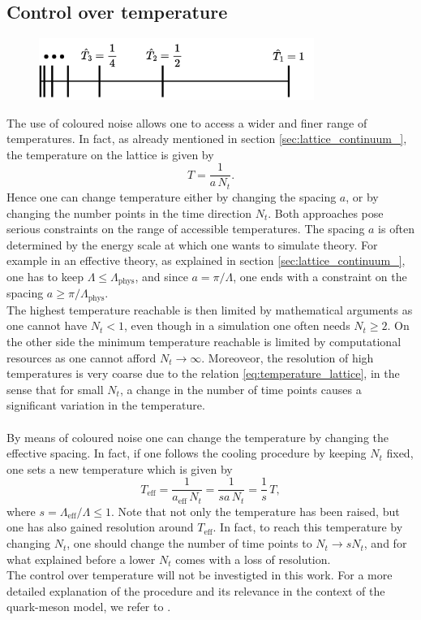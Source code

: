 \subsection{Control over temperature}
\begin{figure}
    \centering 
    \includegraphics[width=0.8\textwidth]{figures/temperatures.pdf}
    \caption[Temperatures on the lattice]{}
    \label{fig:temperatures_lattice}
\end{figure}
The use of coloured noise allows one to access a wider and finer range of temperatures. In fact, as already mentioned in section \ref{sec:lattice_continuum_}, the temperature on the lattice is given by 
\begin{equation}
    T = \frac{1}{a \, N_t}.
    \label{eq:temperature_lattice}
\end{equation}
Hence one can change temperature either by changing the spacing $a$, or by changing the number points in the time direction $N_t$. 
Both approaches pose serious constraints on the range of accessible temperatures. The spacing $a$ is often determined by the energy scale at which one wants to simulate theory. 
For example in an effective theory, as explained in section \ref{sec:lattice_continuum_}, one has to keep $\Lambda \leq \Lambda_\text{phys}$, and since $a = \pi/\Lambda$, one ends with a constraint on the spacing $a \geq \pi/\Lambda_\text{phys}$. \\
The highest temperature reachable is then limited by mathematical arguments as one cannot have $N_t < 1$, even though in a simulation one often needs $N_t \geq 2$. On the other side the minimum temperature reachable is limited by computational resources as one cannot afford $N_t \to \infty$.
Moreoveor, the resolution of high temperatures is very coarse due to the relation \eqref{eq:temperature_lattice}, in the sense that for small $N_t$, a change in the number of time points causes a significant variation in the temperature. \\~\\
By means of coloured noise one can change the temperature by changing the effective spacing. In fact, if one follows the cooling procedure by keeping $N_t$ fixed, one sets a new temperature which is given by 
\begin{equation*}
    T_\text{eff} = \frac{1}{a_\text{eff} \, N_t} = \frac{1}{sa \, N_t} = \frac{1}{s} \, T,
\end{equation*}
where $s = \Lambda_\text{eff} / \Lambda \leq 1$. Note that not only the temperature has been raised, but one has also gained resolution around $T_\text{eff}$. In fact, to reach this temperature by changing $N_t$, one should change the number of time points to $N_t \to s N_t$, and for what explained before a lower $N_t$ comes with a loss of resolution. \\
The control over temperature will not be investigted in this work. For a more detailed explanation of the procedure and its relevance in the context of the quark-meson model, we refer to \cite{attanasio2022low}.
\newpage
